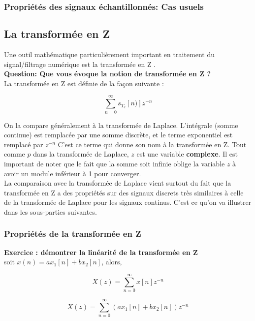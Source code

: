 \documentclass[11pt,a4paper]{article}
\begin{document}
\subsubsection{Propriétés des signaux échantillonnés: Cas usuels}

\subsection{La transformée en Z}
Une outil mathématique particulièrement important en traitement du signal/filtrage numérique est la transformée en Z .\\

\textbf{Question: Que vous évoque la notion de transformée en Z ?}\\

La transformée en Z est définie de la façon suivante :

\[\sum_{n = 0}^{\infty} s_{T_e}[n)] z^{-n}\] 

On la compare généralement à la transformée de Laplace. L'intégrale (somme continue) est remplacée par une somme discrète, et le terme exponentiel est remplacé par $z^{-n}$ C'est ce terme qui donne son nom à la transformée en Z. Tout comme $p$ dans la transformée de Laplace, $z$  est une variable \textbf{complexe}. Il est important de noter que le fait que la somme soit infinie oblige la variable $z$ à avoir un module inférieur à 1 pour converger.\\

La comparaison avec la transformée de Laplace vient surtout du fait que la transformée en Z a des propriétés sur des signaux discrets très similaires à celle de la transformée de Laplace pour les signaux continus. C'est ce qu'on va illustrer dans les sous-parties suivantes.\\

\subsubsection{Propriétés de la transformée en Z}

\textbf{Exercice : démontrer la linéarité de la transformée en Z}\\

soit $x(n) = a x_1[n] + b x_2[n]$, alors,

\[X(z) = \sum_{n = 0}^{\infty} x[n] z^{-n}\] 

\[X(z) = \sum_{n = 0}^{\infty} (a x_1[n] + b x_2[n]) z^{-n}\] 
\end{document}
